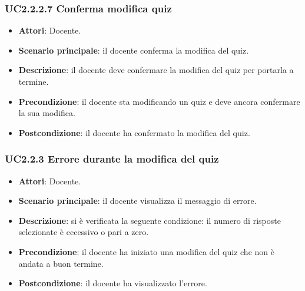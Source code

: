 \subsubsection{UC2.2.2.7 Conferma modifica quiz}
\begin{itemize}
\item \textbf{Attori}: Docente.
\item \textbf{Scenario principale}: il docente conferma la modifica del quiz.
\item \textbf{Descrizione}: il docente deve confermare la modifica del quiz per portarla a termine.
\item \textbf{Precondizione}: il docente sta modificando un quiz e deve ancora confermare la sua modifica.
\item \textbf{Postcondizione}: il docente ha confermato la modifica del quiz.
\end{itemize}
\subsubsection{UC2.2.3 Errore durante la modifica del quiz}
\begin{itemize}
\item \textbf{Attori}: Docente.
\item \textbf{Scenario principale}: il docente visualizza il messaggio di errore.
\item \textbf{Descrizione}: si è verificata la seguente condizione: il numero di risposte selezionate è eccessivo o pari a zero.
\item \textbf{Precondizione}: il docente ha iniziato una modifica del quiz che non è andata a buon termine.
\item \textbf{Postcondizione}: il docente ha visualizzato l'errore.
\end{itemize}
